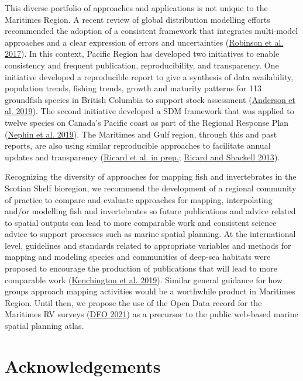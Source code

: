 \documentclass[12pt]{article}\usepackage[]{graphicx}\usepackage[]{color}
\begin{document}
This diverse portfolio of approaches and applications is not unique to the Maritimes Region. A recent review of global distribution modelling efforts recommended the adoption of a consistent framework that integrates multi-model approaches and a clear expression of errors and uncertainties (\protect\hyperlink{ref-Robinson:2017}{Robinson et al. 2017}). In this context, Pacific Region has developed two initiatives to enable consistency and frequent publication, reproducibility, and transparency. One initiative developed a reproducible report to give a synthesis of data availability, population trends, fishing trends, growth and maturity patterns for 113 groundfish species in British Columbia to support stock assessment (\protect\hyperlink{ref-Anderson:2019}{Anderson et al. 2019}). The second initiative developed a SDM framework that was applied to twelve species on Canada's Pacific coast as part of the Regional Response Plan (\protect\hyperlink{ref-Nephin:2019}{Nephin et al. 2019}). The Maritimes and Gulf region, through this and past reports, are also using similar reproducible approaches to facilitate annual updates and transparency (\protect\hyperlink{ref-Ricard:GULFatlas:2021}{Ricard et al. in prep.}; \protect\hyperlink{ref-Ricard:MARatlas:2013}{Ricard and Shackell 2013}).

Recognizing the diversity of approaches for mapping fish and invertebrates in the Scotian Shelf bioregion, we recommend the development of a regional community of practice to compare and evaluate approaches for mapping, interpolating and/or modelling fish and invertebrates so future publications and advice related to spatial outputs can lead to more comparable work and consistent science advice to support processes such as marine spatial planning. At the international level, guidelines and standards related to appropriate variables and methods for mapping and modeling species and communities of deep-sea habitats were proposed to encourage the production of publications that will lead to more comparable work (\protect\hyperlink{ref-Kenchington2019}{Kenchington et al. 2019}). Similar general guidance for how groups approach mapping activities would be a worthwhile product in Maritimes Region. Until then, we propose the use of the Open Data record for the Maritimes RV surveys (\protect\hyperlink{ref-OpenData_MAR_RV}{DFO 2021}) as a precursor to the public web-based marine spatial planning atlas.

\hypertarget{acknowledgements}{%
\section{Acknowledgements}\label{acknowledgements}}
\end{document}
